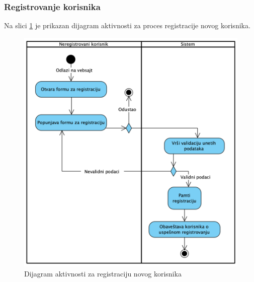 \documentclass[a4paper]{article}
\begin{document}
\subsubsection{Registrovanje korisnika}
Na slici \ref{dakt_registr_korisnika} je prikazan dijagram aktivnosti za proces registracije novog korisnika.
\begin{figure}[h!]
    \centering
    \includegraphics[scale=0.64]{images/dakt_registr_korisnika.png}
    \caption{Dijagram aktivnosti za registraciju novog korisnika}
    \label{dakt_registr_korisnika}
\end{figure}
\end{document}
